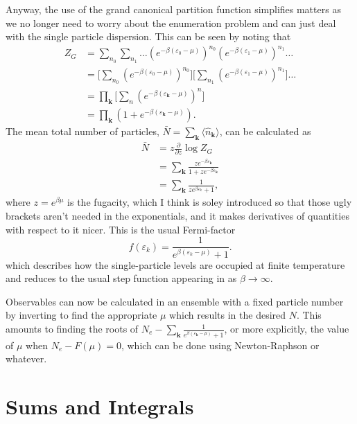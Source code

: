 \documentclass[11pt,twosided]{article}
\begin{document}
Anyway, the use of the grand canonical partition function simplifies matters as we no longer need to worry about the enumeration problem and can just deal with the single particle dispersion.
This can be seen by noting that
\begin{align}
    Z_G &= \sum_{n_0}\sum_{n_1}\dots (e^{-\beta(\varepsilon_0-\mu)})^{n_0}(e^{-\beta(\varepsilon_1-\mu)})^{n_1} \dots \\
        &= \Big[\sum_{n_0}(e^{-\beta(\varepsilon_0-\mu)})^{n_0}\Big]\Big[\sum_{n_1}(e^{-\beta(\varepsilon_1-\mu)})^{n_1}\Big]\dots \\
        &= \prod_\mathbf{k}\Big[\sum_n (e^{-\beta(\varepsilon_\mathbf{k}-\mu)})^n\Big] \\
        &= \prod_\mathbf{k}(1+e^{-\beta(\varepsilon_\mathbf{k}-\mu)}).
\end{align}
The mean total number of particles, $\bar{N} = \sum_{\mathbf{k}}\langle \hat{n}_{\mathbf{k}}\rangle$, can be calculated as
\begin{align}\label{nav}
    \bar{N} &= z\frac{\partial}{\partial z} \log Z_G \\
            &= \sum_{\mathbf{k}}\frac{z e^{-\beta\varepsilon_{\mathbf{k}}}}{1+z e^{-\beta\varepsilon_{\mathbf{k}}}}\\
            &= \sum_{\mathbf{k}}\frac{1}{ze^{ \beta\varepsilon_k} + 1},\label{av_p}
\end{align}
where $z=e^{\beta\mu}$ is the fugacity, which I think is soley introduced so that those ugly brackets aren't needed in the exponentials, and it makes derivatives of quantities with respect to it nicer.
This is the usual Fermi-factor
\begin{equation}\label{fermi}
    f(\varepsilon_k) = \frac{1}{e^{\beta(\varepsilon_k-\mu)} + 1}.
\end{equation}
which describes how the single-particle levels are occupied at finite temperature and reduces to the usual step function appearing in  as $\beta\rightarrow\infty$.

Observables can now be calculated in an ensemble with a fixed particle number by inverting  to find the appropriate $\mu$ which results in the desired $N$.
This amounts to finding the roots of $N_e - \sum_\mathbf{k} \frac{1}{e^{\beta(\varepsilon_\mathbf{k} - \mu)}+1}$, or more explicitly, the value of $\mu$ when $N_e - F(\mu) = 0$, which can be done using Newton-Raphson or whatever.

\section{Sums and Integrals}
\end{document}
